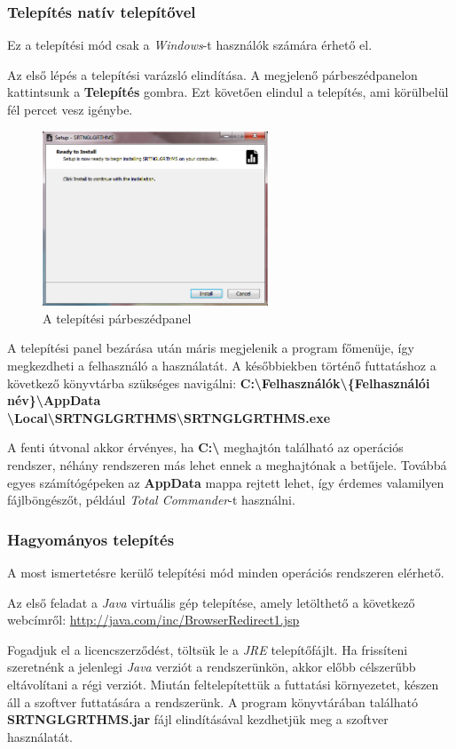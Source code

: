 \documentclass{elteikthesis}
\begin{document}
\subsubsection{Telepítés natív telepítővel}
Ez a telepítési mód csak a \emph{Windows}-t használók számára érhető el.\par
Az első lépés a telepítési varázsló elindítása. A megjelenő párbeszédpanelon kattintsunk a \textbf{Telepítés} gombra. Ezt követően elindul a telepítés, ami körülbelül fél percet vesz igénybe.\par
\begin{figure}[H]
	\centering
	\includegraphics[width=0.6\textwidth]{pics/setup.png}
	\caption{A telepítési párbeszédpanel}
\end{figure}
A telepítési panel bezárása után máris megjelenik a program főmenüje, így megkezdheti a felhasználó a használatát. A későbbiekben történő futtatáshoz a következő könyvtárba szükséges navigálni: \textbf{C:\textbackslash Felhasználók\textbackslash \{Felhasználói név\}\textbackslash AppData\\ \textbackslash Local\textbackslash SRTNGLGRTHMS\textbackslash SRTNGLGRTHMS.exe} \par
A fenti útvonal akkor érvényes, ha \textbf{C:\textbackslash} meghajtón található az operációs rendszer, néhány rendszeren más lehet ennek a meghajtónak a betűjele. Továbbá egyes számítógépeken az \textbf{AppData} mappa rejtett lehet, így érdemes valamilyen fájlböngészőt, például \emph{Total Commander}-t használni.

\subsubsection{Hagyományos telepítés}
A most ismertetésre kerülő telepítési mód minden operációs rendszeren elérhető.\par
Az első feladat a \emph{Java} virtuális gép telepítése, amely letölthető a következő webcímről: \url{http://java.com/inc/BrowserRedirect1.jsp}\par
Fogadjuk el a licencszerződést, töltsük le a \emph{JRE} telepítőfájlt. Ha frissíteni szeretnénk a jelenlegi \emph{Java} verziót a rendszerünkön, akkor előbb célszerűbb eltávolítani a régi verziót. Miután feltelepítettük a futtatási környezetet,  készen áll a szoftver futtatására a rendszerünk. A program könyvtárában található \textbf{SRTNGLGRTHMS.jar} fájl elindításával kezdhetjük meg a szoftver használatát.
\end{document}
